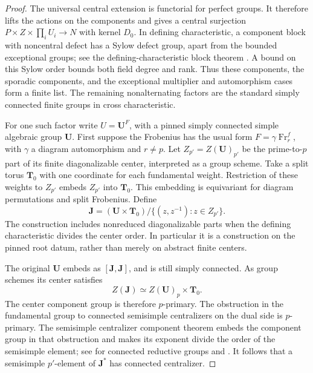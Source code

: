 \begin{proof}
The universal central extension is functorial for perfect groups.
It therefore lifts the actions on the components and gives a central
surjection $P\times Z\times\prod_iU_i\to N$ with kernel $D_0$.
In defining characteristic, a component block with noncentral defect
has a Sylow defect group, apart from the bounded exceptional groups;
see the defining-characteristic block theorem \cite{HumphreysDefining}.
A bound on this Sylow order bounds both field degree and rank.
Thus these components, the sporadic components, and the exceptional
multiplier and automorphism cases form a finite list.  The remaining
nonalternating factors are the standard simply connected finite
groups in cross characteristic.

For one such factor write $U=\mathbf U^F$, with a pinned simply
connected simple algebraic group $\mathbf U$.  First suppose the
Frobenius has the usual form $F=\gamma\operatorname{Fr}_r^f$, with
$\gamma$ a diagram automorphism and $r\ne p$.  Let
$Z_{p'}=Z(\mathbf U)_{p'}$ be the prime-to-$p$ part of its finite
diagonalizable center, interpreted as a group scheme.  Take a split
torus $\mathbf T_0$ with one coordinate for each fundamental weight.
Restriction of these weights to $Z_{p'}$ embeds $Z_{p'}$ into
$\mathbf T_0$.  This embedding is equivariant for diagram
permutations and split Frobenius.  Define
\begin{equation}\label{eq:ext:partial-regular}
 \mathbf J=(\mathbf U\times\mathbf T_0)/
 \{(z,z^{-1}):z\in Z_{p'}\}.
\end{equation}
The construction includes nonreduced diagonalizable parts when the
defining characteristic divides the center order.  In particular it
is a construction on the pinned root datum, rather than merely on
abstract finite centers.

The original $\mathbf U$ embeds as $[\mathbf J,\mathbf J]$, and is
still simply connected.  As group schemes its center satisfies
\[
 Z(\mathbf J)\simeq Z(\mathbf U)_p\times\mathbf T_0.
\]
The center component group is therefore $p$-primary.  The obstruction
in the fundamental group to
connected semisimple centralizers on the dual side is $p$-primary.
The semisimple centralizer component theorem embeds the component
group in that obstruction and makes its exponent divide the order
of the semisimple element; see
\cite[Corollary~2.9]{BonnafeQuasiIsolated} for connected reductive
groups and \cite[Proposition~14.20]{MalleTesterman}.
It follows that a semisimple $p'$-element of $\mathbf J^*$ has
connected centralizer.


\end{proof}
